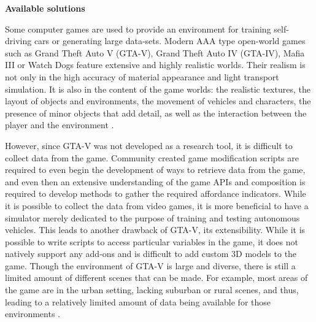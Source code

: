 \documentclass{VUMIFPS-master-intro}
\begin{document}


\textbf{Available solutions}

Some computer games are used to provide an environment for training self-driving cars or generating large data-sets. Modern AAA type open-world games such as Grand Theft Auto V (GTA-V), Grand Theft Auto IV (GTA-IV), Mafia III or Watch Dogs feature extensive and highly realistic worlds. Their realism is not only in the high accuracy of material appearance and light transport simulation. It is also in the content of the game worlds: the realistic textures, the layout of objects and environments, the movement of vehicles and characters, the presence of minor objects that add detail, as well as the interaction between the player and the environment \cite{Richter2016}. 

However, since GTA-V was not developed as a research tool, it is difficult to collect data from the game. Community created game modification scripts are required to even begin the development of ways to retrieve data from the game, and even then an extensive understanding of the game APIs and composition is required to develop methods to gather the required affordance indicators. While it is possible to collect the data from video games, it is more beneficial to have a simulator merely dedicated to the purpose of training and testing autonomous vehicles. This leads to another drawback of GTA-V, its extensibility. While it is possible to write scripts to access particular variables in the game, it does not natively support any add-ons and is difficult to add custom 3D models to the game. Though the environment of GTA-V is large and diverse, there is still a limited amount of different scenes that can be made. For example, most areas of the game are in the urban setting, lacking suburban or rural scenes, and thus, leading to a relatively limited amount of data being available for those environments \cite{Martinez2017}.
\end{document}

